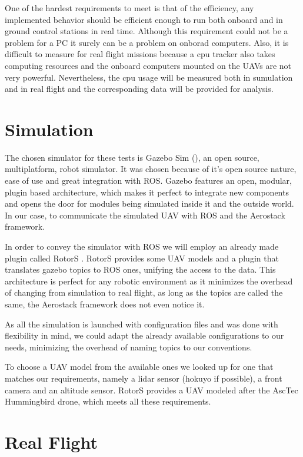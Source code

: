   One of the hardest requirements to meet is that of the efficiency, any implemented behavior should be efficient enough to run both onboard and in ground control stations in real time. Although this requirement could not be a problem for a PC it surely can be a problem on onborad computers. Also, it is difficult to measure for real flight missions because a cpu tracker also takes computing resources and the onboard computers mounted on the UAVs are not very powerful. Nevertheless, the cpu usage will be measured both in sumulation and in real flight and the corresponding data will be provided for analysis.

\section{Simulation} \label{ch_5:sect:simulation}

  The chosen simulator for these tests is Gazebo Sim (\cite{gazebo_web}), an open source, multiplatform, robot simulator. It was chosen because of it's open source nature, ease of use and great integration with ROS. Gazebo features an open, modular, plugin based architecture, which makes it perfect to integrate new components and opens the door for modules being simulated inside it and the outside world. In our case, to communicate the simulated UAV with ROS and the Aerostack framework.

  In order to convey the simulator with ROS we will employ an already made plugin called RotorS \cite{rotors2016}. RotorS provides some UAV models and a plugin that translates gazebo topics to ROS ones, unifying the access to the data. This architecture is perfect for any robotic environment as it minimizes the overhead of changing from simulation to real flight, as long as the topics are called the same, the Aerostack framework does not even notice it.

  As all the simulation is launched with configuration files and was done with flexibility in mind, we could adapt the already available configurations to our needs, minimizing the overhead of naming topics to our conventions.

  To choose a UAV model from the available ones we looked up for one that matches our requirements, namely a lidar sensor (hokuyo if possible), a front camera and an altitude sensor. RotorS provides a UAV modeled after the AscTec Hummingbird \cite{hummingbird_web} drone, which meets all these requirements.

\section{Real Flight} \label{ch_5:sect:real_flight}

